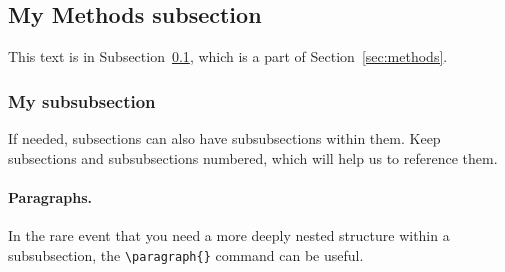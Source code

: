 \subsection{My Methods subsection}\label{subsec:my_subsec}

This text is in Subsection~\ref{subsec:my_subsec}, which is a part of Section~\ref{sec:methods}.

\subsubsection{My subsubsection}

If needed, subsections can also have subsubsections within them. Keep subsections and subsubsections numbered, which will help us to reference them.

\paragraph{Paragraphs.} In the rare event that you need a more deeply nested structure within a subsubsection, the \texttt{\textbackslash paragraph\{\}} command can be useful. 
